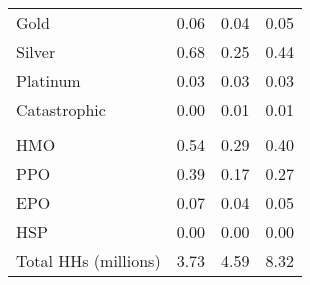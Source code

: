 \begin{tabular}{lrrr}
\hspace{1em}Gold & 0.06 & 0.04 & 0.05\\
\hspace{1em}Silver & 0.68 & 0.25 & 0.44\\
\hspace{1em}Platinum & 0.03 & 0.03 & 0.03\\
\hspace{1em}Catastrophic & 0.00 & 0.01 & 0.01\\
\addlinespace[0.3em]
\multicolumn{4}{l}{\textbf{Network Type}}\\
\hspace{1em}HMO & 0.54 & 0.29 & 0.40\\
\hspace{1em}PPO & 0.39 & 0.17 & 0.27\\
\hspace{1em}EPO & 0.07 & 0.04 & 0.05\\
\hspace{1em}HSP & 0.00 & 0.00 & 0.00\\
Total HHs (millions) & 3.73 & 4.59 & 8.32\\
\bottomrule
\end{tabular}
